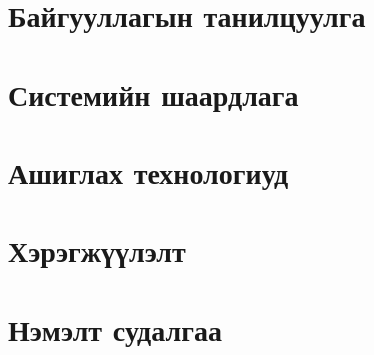 \chapter{Байгууллагын танилцуулга}

\chapter{Системийн шаардлага}

\chapter{Ашиглах технологиуд}

\chapter{Хэрэгжүүлэлт}

\chapter{Нэмэлт судалгаа}

